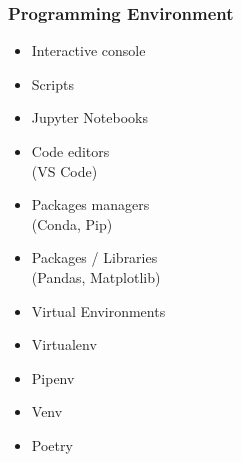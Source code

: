 \begin{frame}\frametitle{Programming Environment}

   \begin{minipage}{0.48\linewidth}
      \begin{itemize}
         \item Interactive console   
         \item Scripts
         \item Jupyter Notebooks
         \item Code editors\\(VS Code)
         \item Packages managers\\(Conda, Pip)
         \item Packages / Libraries\\(Pandas, Matplotlib)
         \item Virtual Environments
      \end{itemize}
   \end{minipage}
   \begin{minipage}{0.5\linewidth}
      \begin{itemize}
         \item Virtualenv
         \item Pipenv
         \item Venv
         \item Poetry
      \end{itemize}
   \end{minipage}
\end{frame}


